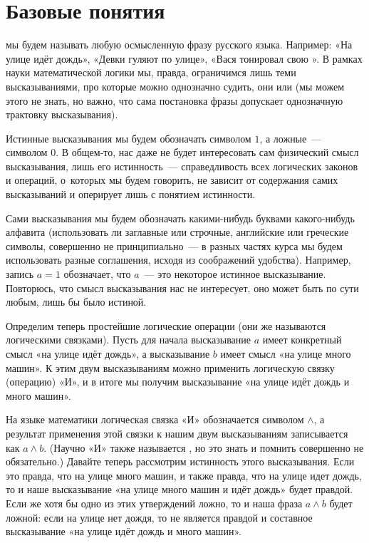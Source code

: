 \section{Базовые понятия}

 мы будем называть любую осмысленную фразу русского языка. Например: «На улице идёт дождь», «Девки гуляют по улице», «Вася тонировал свою \grqq». В рамках науки математической логики мы, правда, ограничимся лишь теми высказываниями, про которые можно однозначно судить,  они или  (мы можем этого не знать, но важно, что сама постановка фразы допускает однозначную трактовку высказывания).

Истинные высказывания мы будем обозначать символом $1$, а ложные~— символом $0$. В общем-то, нас даже не будет интересовать сам физический смысл высказывания, лишь его истинность~— справедливость всех логических законов и операций, о~которых мы будем говорить, не зависит от содержания самих высказываний и оперирует лишь с понятием истинности.

Сами высказывания мы будем обозначать какими-нибудь буквами какого-нибудь алфавита (использовать ли заглавные или строчные, английские или греческие символы, совершенно не принципиально~— в разных частях курса мы будем использовать разные соглашения, исходя из соображений удобства). Например, запись $a = 1$ обозначает, что $a$~— это некоторое истинное высказывание. Повторюсь, что смысл высказывания нас не интересует, оно может быть по сути любым, лишь бы было истиной.

Определим теперь простейшие логические операции (они же называются логическими связками). Пусть для начала высказывание $a$ имеет конкретный смысл «на улице идёт дождь», а высказывание $b$ имеет смысл «на улице много машин». К этим двум высказываниям можно применить логическую связку (операцию) «И», и в итоге мы получим высказывание «на улице идёт дождь и много машин».

На языке математики логическая связка «И» обозначается символом $\land$, а результат применения этой связки к нашим двум высказываниям записывается как $a\land b$. (Научно «И» \mbox{также} называется , но это знать и помнить совершенно не обязательно.) Давайте теперь рассмотрим истинность этого высказывания. Если это правда, что на улице много машин, и также правда, что на улице идет дождь, то и наше высказывание «на улице много машин и идёт дождь» будет правдой. Если же хотя бы одно из этих утверждений ложно, то и наша фраза $a \land b$ будет ложной: если на улице нет дождя, то не является правдой и составное высказывание «на улице идёт дождь и много машин».

